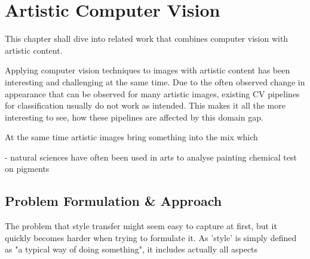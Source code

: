 \setchapterpreamble[u]{\margintoc}
\chapter{Artistic Computer Vision}
This chapter shall dive into related work that combines computer vision with artistic content.

Applying computer vision techniques to images with artistic content has been interesting and challenging at the same time.
Due to the often observed change in appearance that can be observed for many artistic images, existing CV pipelines for \ie classification usually do not work as intended.
This makes it all the more interesting to see, how these pipelines are affected by this domain gap.

At the same time artistic images bring something into the mix which 

- natural sciences have often been used in arts to analyse painting \eg chemical test on pigments








\section{Problem Formulation \& Approach}
The problem that style transfer might seem easy to capture at first, but it quickly becomes harder when trying to formulate it.
As 'style' is simply defined as "a typical way of doing something", it includes actually all aspects 

